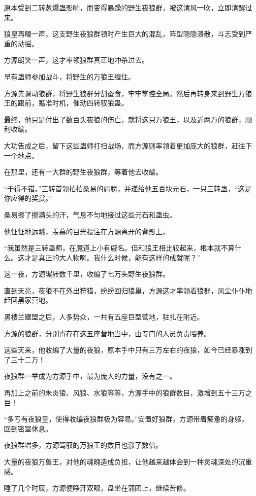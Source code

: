 \begin{this_body}
原本受到二转葱爆蛊影响，而变得暴躁的野生夜狼群，被这清风一吹，立即清醒过来。

狼皇再嚎一声，这支野生夜狼群顿时产生巨大的混乱，阵型隐隐溃散，斗志受到严重的动摇。

方源朗笑一声，这才率领狼群真正地冲杀过去。

早有蛊师参加战斗，将野生的万狼王缠住。

方源先调动狼群，将野生狼群分割蚕食，牢牢掌控全局。然后再转身来到野生万狼王的跟前，瞧准时机，催动四转驭狼蛊。

最终，他只是付出了数百头夜狼的伤亡，就将这只万狼王，以及近两万的狼群，顺利收编。

大功告成之后，留下这些蛊师打扫战场，而方源则率领着更加庞大的狼群，赶往下一个地点。

在那里，还有一大群的野生夜狼群，等着他去收编。

“干得不错。”三转首领拍拍桑易的肩膀，并递给他五百块元石，一只三转蛊，“这是你应得的奖赏。”

桑易擦了擦满头的汗，气息不匀地接过这些元石和蛊虫。

他怔怔地远眺，羡慕的目光投注在方源离开的背影上。

“我虽然是三转蛊师，在魔道上小有威名。但和狼王相比较起来，根本就不算什么。这才是真正的大人物啊。我什么时候，能有这样的成就呢？”

这一夜，方源辗转数千里，收编了七万头野生夜狼群。

直到天亮，夜狼不在外出狩猎，纷纷回归狼巢，方源这才率领着狼群，风尘仆仆地赶回黑家营地。

黑楼兰建盟之后，人多势众，一共有五座巨型营地，驻扎在附近。

方源的狼群，分别寄存在这五座营地当中，由专门的人员负责喂养。

这些天来，他收编了大量的夜狼，原本手中只有三万左右的夜狼，如今已经暴涨到了三十二万！

夜狼群一举成为方源手中，最为庞大的力量，没有之一。

再加上之前的朱炎狼、风狼、水狼等等，方源手中的狼群数目，激增到五十三万之巨！

“多亏有夜狼皇，使得收编夜狼群极为容易。”安置好狼群，方源带着疲惫的身躯，回到密室休息。

夜狼群增多，方源驾驭的万狼王的数目也涨了数倍。

大量的夜狼万兽王，对他的魂魄造成负担，让他越来越体会到一种灵魂深处的沉重感。

睡了几个时辰，方源便睁开双眼，盘坐在蒲团上，继续苦修。


\end{this_body}

